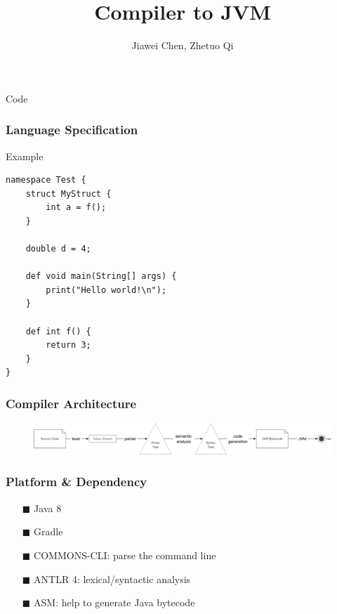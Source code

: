\documentclass{beamer}
\begin{document}
\title{Compiler to JVM}
\author{Jiawei Chen, Zhetuo Qi}
\begin{frame}
    \maketitle
\end{frame}

\begin{frame}[fragile]{Code}
    \frametitle{Language Specification}
    \begin{block}{Example}
        \begin{lstlisting}[firstnumber=1, label=glabels, xleftmargin=10pt] 
namespace Test {
    struct MyStruct {
        int a = f();
    }

    double d = 4;

    def void main(String[] args) {
        print("Hello world!\n");
    }

    def int f() {
        return 3;
    }
}
        \end{lstlisting}
    \end{block}
\end{frame}

\begin{frame}
    \frametitle{Compiler Architecture}
    \begin{figure}[h]
        \centering
        \includegraphics[scale=0.28]{assets/architecture.png}    
    \end{figure}
\end{frame}

\begin{frame}
    \frametitle{Platform \& Dependency}

    \begin{itemize}
        \item[$\blacksquare$] Java 8
        \item[$\blacksquare$] Gradle
        \item[$\blacksquare$] COMMONS-CLI: parse the command line
        \item[$\blacksquare$] ANTLR 4: lexical/syntactic analysis
        \item[$\blacksquare$] ASM: help to generate Java bytecode
    \end{itemize}
\end{frame}
\end{document}
